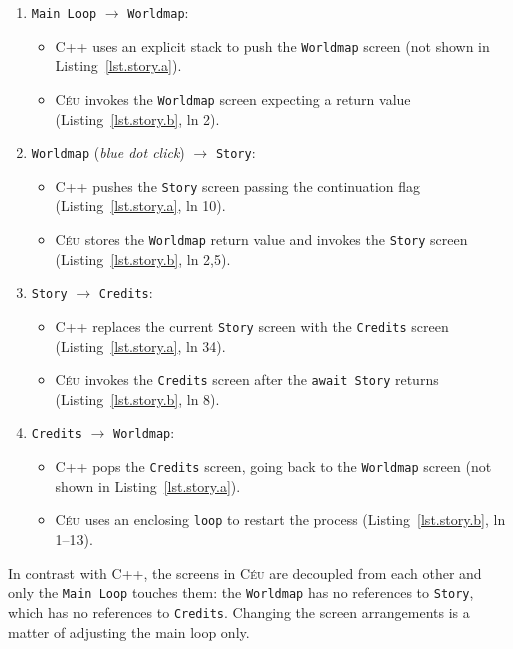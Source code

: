 \documentclass[10pt, conference, compsocconf]{IEEEtran}
\newcommand{\CEU}{\textsc{C\'{e}u}\xspace}
\newcommand{\code}[1] {{\small{\texttt{#1}}}}
\begin{document}
\begin{enumerate}
\item \code{Main Loop} $\longrightarrow$ \code{Worldmap}:
    \begin{itemize}
    \item C++ uses an explicit stack to push the \code{Worldmap} screen (not
          shown in Listing~\ref{lst.story.a}).
    \item \CEU invokes the \code{Worldmap} screen expecting a return value
          (Listing~\ref{lst.story.b}, ln 2).
    \end{itemize}
\item \code{Worldmap} (\emph{blue dot click}) $\longrightarrow$ \code{Story}:
    \begin{itemize}
    \item C++ pushes the \code{Story} screen passing the continuation flag
          (Listing~\ref{lst.story.a}, ln 10).
    \item \CEU stores the \code{Worldmap} return value and invokes the \code{Story} screen
          (Listing~\ref{lst.story.b}, ln 2,5).
    \end{itemize}
\item \code{Story} $\longrightarrow$ \code{Credits}:
    \begin{itemize}
    \item C++ replaces the current \code{Story} screen with the \code{Credits}
          screen (Listing~\ref{lst.story.a}, ln 34).
    \item \CEU invokes the \code{Credits} screen after the \code{await Story}
          returns (Listing~\ref{lst.story.b}, ln 8).
    \end{itemize}
\item \code{Credits} $\longrightarrow$ \code{Worldmap}:
    \begin{itemize}
    \item C++ pops the \code{Credits} screen, going back to the \code{Worldmap}
          screen (not shown in Listing~\ref{lst.story.a}).
    \item \CEU uses an enclosing \code{loop} to restart the process
          (Listing~\ref{lst.story.b}, ln 1--13).
    \end{itemize}
\end{enumerate}

In contrast with C++, the screens in \CEU are decoupled from each other and
only the \code{Main Loop} touches them: the \code{Worldmap} has no references
to \code{Story}, which has no references to \code{Credits}.
Changing the screen arrangements is a matter of adjusting the main loop only.
\end{document}
